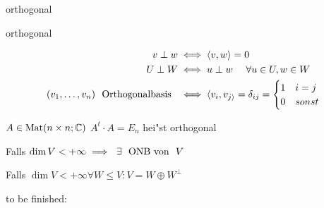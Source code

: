 \documentclass[class=article, crop=false]{standalone}
\begin{document}
\begin{zettel}{orthogonal}
\begin{flashcard}[4exzeudu]{orthogonal}
	\begin{definition}
		\begin{align*}
			v \perp w                               & \iff  \langle v,w\rangle =0                                 \\
			U \perp W                               & \iff  u \perp w \quad \forall u \in  U, w \in  W            \\
			(v_1,\dots,v_n)  \tx{ Orthogonalbasis } & \iff  \langle v_i,v_{j\rangle}= \delta_{i j} = \begin{cases}
				                                                                                         1 & i=j   \\
				                                                                                         0 & sonst
			                                                                                         \end{cases}
		\end{align*}
	\end{definition}
\end{flashcard}

\begin{definition}
	$A \in  \operatorname{Mat}(n \times n; \mathbb{C} )$  $A^t \cdot  A = E_n$ hei"st orthogonal
\end{definition}

\begin{corollary}
	Falls $\dim V < + \infty \implies \exists \tx{ ONB von } V$
\end{corollary}

\begin{corollary}
	Falls $\dim V < + \infty \forall W \leq V : V = W \oplus W^{\perp}$
\end{corollary}


to be finished:

\end{zettel}
\end{document}
